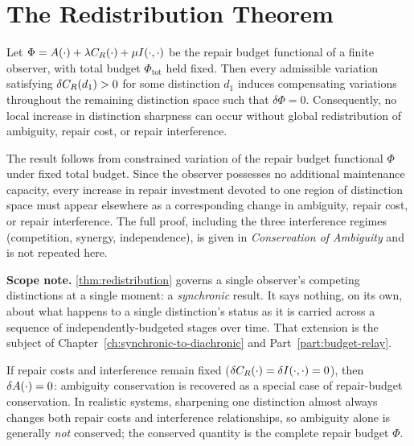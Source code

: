 \section{The Redistribution Theorem}

\begin{theorem}
\label{thm:redistribution}
Let $\Phi = A(\cdot) + \lambda C_R(\cdot) + \mu I(\cdot,\cdot)$ be
the repair budget functional of a finite observer, with total budget
$\Phi_{\mathrm{tot}}$ held fixed. Then every admissible variation
satisfying $\delta C_R(d_1) > 0$ for some distinction $d_1$ induces
compensating variations throughout the remaining distinction space such
that $\delta\Phi = 0$. Consequently, no local increase in distinction
sharpness can occur without global redistribution of ambiguity, repair
cost, or repair interference.
\end{theorem}

\begin{proofsketch}
 The result follows from constrained
variation of the repair budget functional $\Phi$ under fixed total
budget. Since the observer possesses no additional maintenance capacity,
every increase in repair investment devoted to one region of distinction
space must appear elsewhere as a corresponding change in ambiguity,
repair cost, or repair interference. The full proof, including the three
interference regimes (competition, synergy, independence), is given in
\emph{Conservation of Ambiguity} and is not repeated here.
\end{proofsketch}

\textbf{Scope note.} \cref{thm:redistribution} governs a single observer's
competing distinctions at a single moment: a \emph{synchronic} result. It
says nothing, on its own, about what happens to a single distinction's
status as it is carried across a sequence of independently-budgeted
stages over time. That extension is the subject of
Chapter~\ref{ch:synchronic-to-diachronic} and Part~\ref{part:budget-relay}.

\begin{corollary}
\label{cor:ambiguity-limiting-case}
If repair costs and interference remain fixed ($\delta C_R(\cdot) =
\delta I(\cdot,\cdot) = 0$), then $\delta A(\cdot) = 0$: ambiguity
conservation is recovered as a special case of repair-budget conservation.
In realistic systems, sharpening one distinction almost always changes
both repair costs and interference relationships, so ambiguity alone is
generally \emph{not} conserved; the conserved quantity is the complete
repair budget $\Phi$.
\end{corollary}

